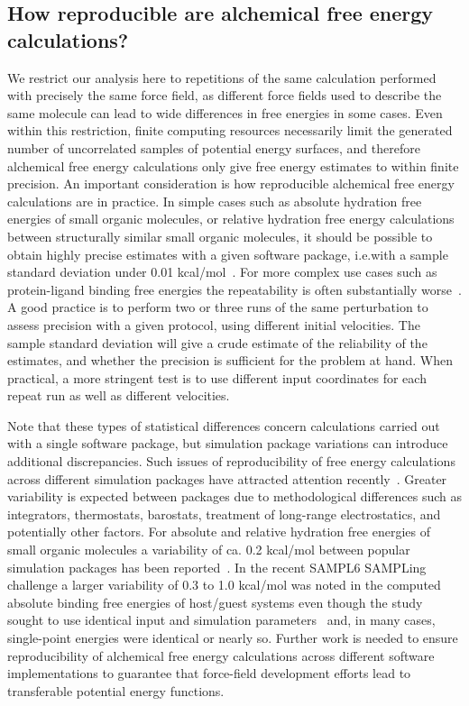 \documentclass[9pt,bestpractices,pubversion]{livecoms}
\begin{document}
\subsection{How reproducible are alchemical free energy calculations?}
\label{subsec:reproducible}
We restrict our analysis here to repetitions of the same calculation performed with precisely the same force field, as different force fields used to describe the same molecule can lead to wide differences in free energies in some cases.  Even within this restriction,
finite computing resources necessarily limit the generated number of uncorrelated samples of potential energy surfaces, and therefore alchemical free energy calculations only give free energy estimates to within finite precision. An important consideration is how reproducible alchemical free energy calculations are in practice. In simple cases such as absolute hydration free energies of small organic molecules, or relative hydration free energy calculations between structurally similar small organic molecules, it should be possible to obtain highly precise estimates with a given software package, i.e.with a sample standard deviation under 0.01 kcal/mol~\cite{rizzi2019sampl6}.
For more complex use cases such as protein-ligand binding free energies the repeatability is often substantially worse~\cite{rizzi2019sampl6}. A good practice is to perform two or three runs of the same perturbation to assess precision with a given protocol, using different initial velocities. The sample standard deviation will give a crude estimate of the reliability of the estimates, and whether the precision is sufficient for the problem at hand. When practical, a more stringent test is to use different input coordinates for each repeat run as well as different velocities. 

Note that these types of statistical differences concern calculations carried out with a single software package, but simulation package variations can introduce additional discrepancies. Such issues of reproducibility of free energy calculations across different simulation packages have attracted attention recently~\cite{loeffler2018reproducibility,rizzi2019sampl6}. Greater variability is expected between packages due to methodological differences such as integrators, thermostats, barostats, treatment of long-range electrostatics, and potentially other factors. For absolute and relative hydration free energies of small organic molecules a variability of ca. 0.2 kcal/mol between popular simulation packages has been reported~\cite{loeffler2018reproducibility}. In the recent SAMPL6 SAMPLing challenge a larger variability of 0.3 to 1.0 kcal/mol was noted in the computed absolute binding free energies of host/guest systems even though the study sought to use identical input and simulation parameters~\cite{rizzi2019sampl6} and, in many cases, single-point energies were identical or nearly so. Further work is needed to ensure reproducibility of alchemical free energy calculations across different software implementations to guarantee that force-field development efforts lead to transferable potential energy functions. 
\end{document}
